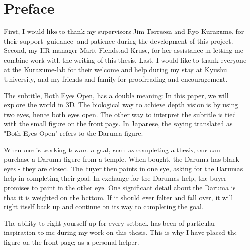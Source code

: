 \chapter*{Preface}
First, I would like to thank my supervisors Jim Tørresen and Ryo Kurazume, for their support, guidance, and patience during the development of this project. Second, my HR manager Marit Flendstad Kruse, for her assistance in letting me combine work with the writing of this thesis. Last, I would like to thank everyone at the Kurazume-lab for their welcome and help during my stay at Kyushu University, and my friends and family for proofreading and encouragement.

The subtitle, Both Eyes Open, has a double meaning: In this paper, we will explore the world in 3D. The biological way to achieve depth vision is by using two eyes, hence both eyes open. The other way to interpret the subtitle is tied with the small figure on the front page. In Japanese, the saying translated as "Both Eyes Open" refers to the Daruma figure. 

When one is working toward a goal, such as completing a thesis, one can purchase a Daruma figure from a temple. When bought, the Daruma has blank eyes - they are closed. The buyer then paints in one eye, asking for the Darumas help in completing their goal. In exchange for the Darumas help, the buyer promises to paint in the other eye. One significant detail about the Daruma is that it is weighted on the bottom.  If it should ever falter and fall over, it will right itself back up and continue on its way to completing the goal.

The ability to right yourself up for every setback has been of particular inspiration to me during my work on this thesis. This is why I have placed the figure on the front page; as a personal helper.


